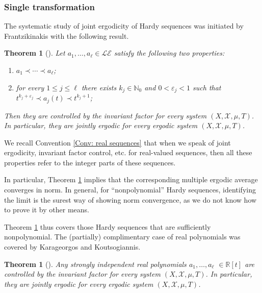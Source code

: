 \documentclass[11pt]{amsart}
\newtheorem{theorem}[lemma]{Theorem}
\theoremstyle{definition}
\newcommand{\N}{{\mathbb N}}
\newcommand{\R}{{\mathbb R}}
\newcommand{\CE}{{\mathcal E}}
\newcommand{\CL}{{\mathcal L}}
\newcommand{\CX}{{\mathcal X}}
\newcommand{\veps}{\varepsilon}
\newcommand{\1}{{\mathbf{1}}}
\begin{document}

\subsubsection{Single transformation}\label{SSS: Hardy single}
The systematic study of joint ergodicity of Hardy sequences was initiated by Frantzikinakis with the following result.
\begin{theorem}%
[{\cite[Theorem 2.6]{Fr10}}]\label{T: Fr nonpolynomial Hardy}
    Let $a_1, \ldots, a_\ell\in\CL\CE$ satisfy the following two properties:
    \begin{enumerate}
        \item $a_1 \prec \cdots \prec a_\ell$;
        \item for every $1\leq j\leq \ell$ there exists $k_j\in\N_0$ and $0<\veps_j<1$ such that $t^{k_j+\veps_j} \prec a_j(t)\prec t^{k_j+1}$;
    \end{enumerate}
    Then they are controlled by the invariant factor for every system $(X, \CX, \mu, T)$. In particular, they are jointly ergodic for every ergodic system $(X, \CX, \mu, T)$.
\end{theorem}
We recall Convention \ref{Conv: real sequences} that when we speak of joint ergodicity, invariant factor control, etc. for real-valued sequences, then all these properties refer to the integer parts of these sequences.

In particular, Theorem \ref{T: Fr nonpolynomial Hardy} implies that the corresponding multiple ergodic average converges in norm. In general, for ``nonpolynomial'' Hardy sequences, identifying the limit is the surest way of showing norm convergence, as we do not know how to prove it by other means. 

Theorem \ref{T: Fr nonpolynomial Hardy} thus covers those Hardy sequences that are sufficiently nonpolynomial. The (partially) complimentary case of real polynomials was covered by Karageorgos and Koutsogiannis.
\begin{theorem}%
[{\cite[Theorem 2.1]{KK19}}]\label{T: KK strongly independent real polys}
    Any strongly independent real polynomials $a_1, \ldots, a_\ell$ $\in\R[t]$ are controlled by the invariant factor for every system $(X, \CX, \mu, T)$. In particular, they are jointly ergodic for every ergodic system $(X, \CX, \mu, T)$.
\end{theorem}
\end{document}

